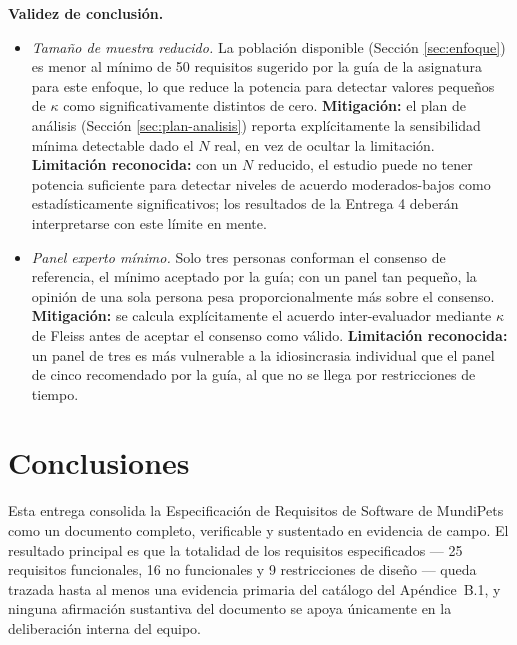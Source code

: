 \documentclass[journal,onecolumn]{IEEEtran}
\begin{document}
	\textbf{Validez de conclusión.}
	\begin{itemize}[leftmargin=*]
		\item \emph{Tamaño de muestra reducido.} La población disponible
		(Sección \ref{sec:enfoque}) es menor al mínimo de 50 requisitos
		sugerido por la guía de la asignatura para este enfoque, lo que
		reduce la potencia para detectar valores pequeños de $\kappa$ como
		significativamente distintos de cero. \textbf{Mitigación:} el plan
		de análisis (Sección \ref{sec:plan-analisis}) reporta explícitamente
		la sensibilidad mínima detectable dado el $N$ real, en vez de ocultar
		la limitación. \textbf{Limitación reconocida:} con un $N$ reducido,
		el estudio puede no tener potencia suficiente para detectar niveles
		de acuerdo moderados-bajos como estadísticamente significativos; los
		resultados de la Entrega 4 deberán interpretarse con este límite en
		mente.
		\item \emph{Panel experto mínimo.} Solo tres personas conforman el
		consenso de referencia, el mínimo aceptado por la guía; con un panel
		tan pequeño, la opinión de una sola persona pesa proporcionalmente
		más sobre el consenso. \textbf{Mitigación:} se calcula
		explícitamente el acuerdo inter-evaluador mediante $\kappa$ de Fleiss
		antes de aceptar el consenso como válido. \textbf{Limitación
			reconocida:} un panel de tres es más vulnerable a la idiosincrasia
		individual que el panel de cinco recomendado por la guía, al que no
		se llega por restricciones de tiempo.
	\end{itemize}
	
	
	\section{Conclusiones}
	\label{sec:conclusiones}
	
	Esta entrega consolida la Especificación de Requisitos de Software de
	MundiPets como un documento completo, verificable y sustentado en evidencia
	de campo. El resultado principal es que la totalidad de los requisitos
	especificados --- 25 requisitos funcionales, 16 no funcionales y 9
	restricciones de diseño --- queda trazada hasta al menos una evidencia
	primaria del catálogo del Apéndice~B.1, y ninguna afirmación sustantiva del
	documento se apoya únicamente en la deliberación interna del equipo.
	
\end{document}
